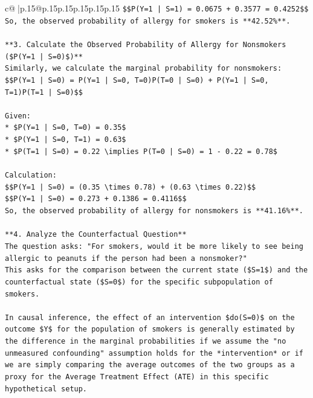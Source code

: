 \documentclass{article}
\begin{document}
{\begin{supertabular}{c@{$\;$}|p{.15\linewidth}@{}p{.15\linewidth}p{.15\linewidth}p{.15\linewidth}p{.15\linewidth}p{.15\linewidth}}
{{{\texttt{\$\$P(Y=1 | S=1) = 0.0675 + 0.3577 = 0.4252\$\$} \\
\texttt{So, the observed probability of allergy for smokers is **42.52\%**.} \\
\\ 
\texttt{**3. Calculate the Observed Probability of Allergy for Nonsmokers (\$P(Y=1 | S=0)\$)**} \\
\texttt{Similarly, we calculate the marginal probability for nonsmokers:} \\
\texttt{\$\$P(Y=1 | S=0) = P(Y=1 | S=0, T=0)P(T=0 | S=0) + P(Y=1 | S=0, T=1)P(T=1 | S=0)\$\$} \\
\\ 
\texttt{Given:} \\
\texttt{*   \$P(Y=1 | S=0, T=0) = 0.35\$} \\
\texttt{*   \$P(Y=1 | S=0, T=1) = 0.63\$} \\
\texttt{*   \$P(T=1 | S=0) = 0.22 \textbackslash{}implies P(T=0 | S=0) = 1 {-} 0.22 = 0.78\$} \\
\\ 
\texttt{Calculation:} \\
\texttt{\$\$P(Y=1 | S=0) = (0.35 \textbackslash{}times 0.78) + (0.63 \textbackslash{}times 0.22)\$\$} \\
\texttt{\$\$P(Y=1 | S=0) = 0.273 + 0.1386 = 0.4116\$\$} \\
\texttt{So, the observed probability of allergy for nonsmokers is **41.16\%**.} \\
\\ 
\texttt{**4. Analyze the Counterfactual Question**} \\
\texttt{The question asks: "For smokers, would it be more likely to see being allergic to peanuts if the person had been a nonsmoker?"} \\
\texttt{This asks for the comparison between the current state (\$S=1\$) and the counterfactual state (\$S=0\$) for the specific subpopulation of smokers.} \\
\\ 
\texttt{In causal inference, the effect of an intervention \$do(S=0)\$ on the outcome \$Y\$ for the population of smokers is generally estimated by the difference in the marginal probabilities if we assume the "no unmeasured confounding" assumption holds for the *intervention* or if we are simply comparing the average outcomes of the two groups as a proxy for the Average Treatment Effect (ATE) in this specific hypothetical setup.} \\
\\ 
}}}
\end{supertabular}}
\end{document}
